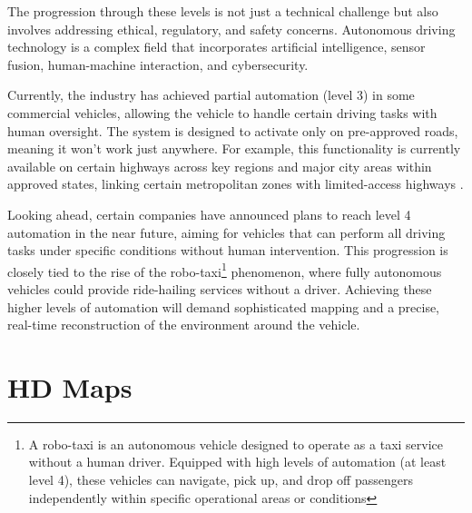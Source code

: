 The progression through these levels is not just a technical challenge but also involves addressing ethical, regulatory, and safety concerns. Autonomous driving technology is a complex field that incorporates artificial intelligence, sensor fusion, human-machine interaction, and cybersecurity. 

Currently, the industry has achieved partial automation (level 3) in some commercial vehicles, allowing the vehicle to handle certain driving tasks with human oversight. The system is designed to activate only on pre-approved roads, meaning it won’t work just anywhere. For example, this functionality is currently available on certain highways across key regions and major city areas within approved states, linking certain metropolitan zones with limited-access highways \cite{bmw2024}.

Looking ahead, certain companies have announced plans to reach level 4 automation in the near future, aiming for vehicles that can perform all driving tasks under specific conditions without human intervention. This progression is closely tied to the rise of the robo-taxi\footnote{A robo-taxi is an autonomous vehicle designed to operate as a taxi service without a human driver. Equipped with high levels of automation (at least level 4), these vehicles can navigate, pick up, and drop off passengers independently within specific operational areas or conditions} phenomenon, where fully autonomous vehicles could provide ride-hailing services without a driver. Achieving these higher levels of automation will demand sophisticated mapping and a precise, real-time reconstruction of the environment around the vehicle.


\section{HD Maps}

